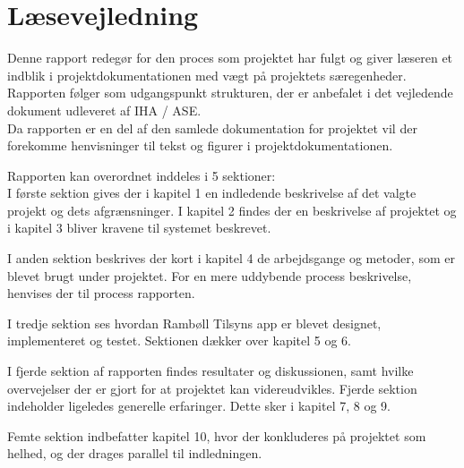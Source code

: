 \section{Læsevejledning}
Denne rapport redegør for den proces som projektet har fulgt og giver læseren et indblik i projektdokumentationen med vægt på projektets særegenheder. Rapporten følger som udgangspunkt strukturen, der er anbefalet i det vejledende dokument udleveret af IHA / ASE.\\
Da rapporten er en del af den samlede dokumentation for projektet vil der forekomme
henvisninger til tekst og figurer i projektdokumentationen.


Rapporten kan overordnet inddeles i 5 sektioner:\\
I første sektion gives der i kapitel 1 en indledende beskrivelse af det valgte projekt og
dets afgrænsninger. I kapitel 2 findes der en beskrivelse af projektet og i kapitel 3 bliver
kravene til systemet beskrevet.

I anden sektion beskrives der kort i kapitel 4 de arbejdsgange og metoder, som er blevet brugt
under projektet. For en mere uddybende process beskrivelse, henvises der til process rapporten.

I tredje sektion ses hvordan Rambøll Tilsyns app er blevet designet, implementeret og testet. 
Sektionen dækker over kapitel 5 og 6.

I fjerde sektion af rapporten findes resultater og diskussionen, samt hvilke overvejelser
der er gjort for at projektet kan videreudvikles. Fjerde sektion indeholder ligeledes generelle erfaringer. Dette sker i kapitel 7, 8 og 9.

Femte sektion indbefatter kapitel 10, hvor der konkluderes på projektet som helhed, og
der drages parallel til indledningen.

